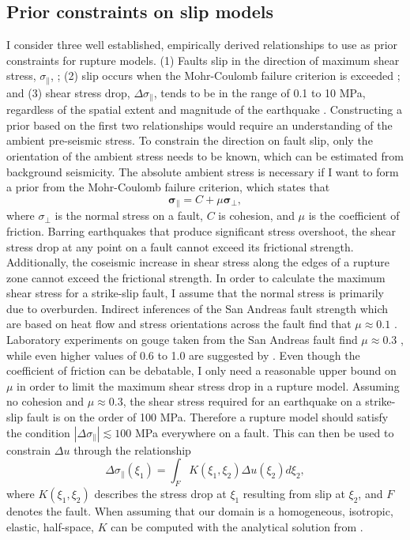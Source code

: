 \documentclass[12pt]{article}
\begin{document}
\subsection*{Prior constraints on slip models}
I consider three well established, empirically derived relationships to use as prior constraints for rupture models. (1) Faults slip in the direction of maximum shear stress, $\sigma_\parallel$, \citep{Wallace1951}; (2) slip occurs when the Mohr-Coulomb failure criterion is exceeded \citep{Byerlee1978}; and (3) shear stress drop, $\Delta \sigma_\parallel$, tends to be in the range of 0.1 to 10 MPa, regardless of the spatial extent and magnitude of the earthquake \citep{Kanamori1975,Shearer2006}.  Constructing a prior based on the first two relationships would require an understanding of the ambient pre-seismic stress.  To constrain the direction on fault slip, only the orientation of the ambient stress needs to be known, which can be estimated from background seismicity.  The absolute ambient stress is necessary if I want to form a prior from the Mohr-Coulomb failure criterion, which states that
\begin{equation}\label{eq:MohrCoulomb}
  \mathbf{\sigma_\parallel} = C + \mu \mathbf{\sigma_\bot},
\end{equation}
where $\sigma_\bot$ is the normal stress on a fault, $C$ is cohesion, and $\mu$ is the coefficient of friction.  Barring earthquakes that produce significant stress overshoot, the shear stress drop at any point on a fault cannot exceed its frictional strength.  Additionally, the coseismic increase in shear stress along the edges of a rupture zone cannot exceed the frictional strength. In order to calculate the maximum shear stress for a strike-slip fault, I assume that the normal stress is primarily due to overburden.  Indirect inferences of the San Andreas fault strength which are based on heat flow and stress orientations across the fault find that $\mu\approx0.1$ \citep{Brune1969,Zoback1987}.  Laboratory experiments on gouge taken from the San Andreas fault find $\mu\approx0.3$ \citep{Carpenter2011}, while even higher values of 0.6 to 1.0 are suggested by \citet{Byerlee1978}. Even though the coefficient of friction can be debatable, I only need a reasonable upper bound on $\mu$ in order to limit the maximum shear stress drop in a rupture model.  Assuming no cohesion and $\mu\approx0.3$, the shear stress required for an earthquake on a strike-slip fault is on the order of 100 MPa.  Therefore a rupture model should satisfy the condition $|\Delta\sigma_\parallel|\lesssim 100$ MPa everywhere on a fault.  This can then be used to constrain $\Delta u$ through the relationship
\begin{equation}\label{eq:StressSlip}
  \Delta \sigma_\parallel (\xi_1) = \int_F K(\xi_1,\xi_2) \Delta u(\xi_2) d\xi_2,
\end{equation}
where $K(\xi_1,\xi_2)$ describes the stress drop at $\xi_1$ resulting from slip at $\xi_2$, and $F$ denotes the fault.  When assuming that our domain is a homogeneous, isotropic, elastic, half-space, $K$ can be computed with the analytical solution from \citet{Okada1992}.  
\end{document}
